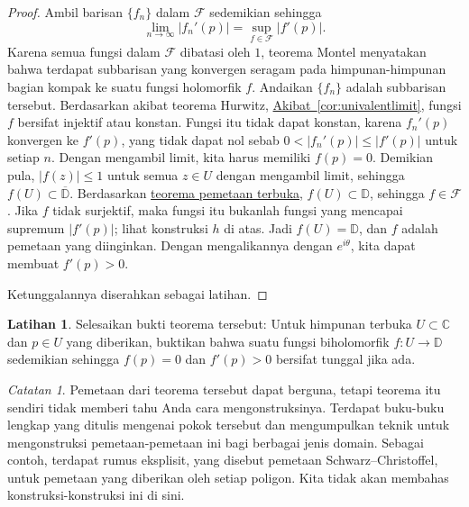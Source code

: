 \documentclass[12pt,openany]{book}
\newcommand{\sabs}[1]{\lvert {#1} \rvert}
\newcommand{\C}{{\mathbb{C}}}
\newcommand{\D}{{\mathbb{D}}}
\newcommand{\sF}{{\mathscr{F}}}
\theoremstyle{plain}
\theoremstyle{remark}
\newtheorem{remark}[thm]{Catatan}
\theoremstyle{definition}
\newenvironment{exbox}{%
    \def\FrameCommand{\vrule width 1pt \relax\hspace{10pt}}%
    \MakeFramed{\advance\hsize-\width\FrameRestore}%
}{%
    \endMakeFramed
}
\theoremstyle{exercise}
\newtheorem{exercise}{Latihan}[section]
\theoremstyle{example}
\newcommand{\corref}[1]{\hyperref[#1]{Akibat~\ref*{#1}}}
\begin{document}
\begin{proof}
Ambil barisan $\{ f_n \}$ dalam
$\sF$ sedemikian sehingga
\begin{equation*}
\lim_{n \to \infty} \sabs{f_n'(p)} = \sup_{f \in \sF} \sabs{f'(p)} .
\end{equation*}
Karena semua fungsi dalam $\sF$ dibatasi oleh $1$,
teorema Montel menyatakan bahwa terdapat subbarisan yang konvergen seragam pada
himpunan-himpunan bagian kompak ke suatu fungsi holomorfik $f$.  Andaikan $\{ f_n \}$ adalah subbarisan tersebut.
Berdasarkan akibat teorema Hurwitz,
\corref{cor:univalentlimit},
fungsi $f$ bersifat injektif atau konstan.  Fungsi itu tidak dapat konstan,
karena $f_n'(p)$ konvergen ke $f'(p)$, yang
tidak dapat nol sebab  
$0 < \sabs{f_n'(p)} \leq \sabs{f'(p)}$ untuk setiap $n$.
Dengan mengambil limit, kita harus memiliki $f(p) = 0$.
Demikian pula,
$\sabs{f(z)} \leq 1$ untuk semua $z \in U$ dengan mengambil limit,
sehingga $f(U) \subset \overline{\D}$.
Berdasarkan \hyperref[thm:OMT]{teorema pemetaan terbuka}, $f(U) \subset \D$, sehingga $f \in
\sF$.  Jika $f$ tidak surjektif, maka fungsi itu bukanlah fungsi yang mencapai
supremum $\sabs{f'(p)}$; lihat konstruksi $h$ di atas.
Jadi $f(U) = \D$, dan $f$ adalah pemetaan yang diinginkan.
Dengan mengalikannya dengan $e^{i\theta}$, kita dapat membuat $f'(p) > 0$.

Ketunggalannya diserahkan sebagai latihan.
\end{proof}

\begin{exbox}
\begin{exercise}
Selesaikan bukti teorema tersebut:
Untuk himpunan terbuka $U \subset \C$ dan $p \in U$ yang diberikan, buktikan
bahwa suatu fungsi biholomorfik 
$f \colon U \to \D$ sedemikian sehingga $f(p) = 0$ dan $f'(p) > 0$ bersifat tunggal jika ada.
\end{exercise}
\end{exbox}

\begin{remark}
Pemetaan dari teorema tersebut dapat berguna, tetapi teorema itu
sendiri tidak memberi tahu Anda cara mengonstruksinya.
Terdapat buku-buku lengkap
yang ditulis mengenai pokok tersebut dan mengumpulkan teknik untuk mengonstruksi
pemetaan-pemetaan ini bagi berbagai jenis domain.
Sebagai contoh, terdapat rumus eksplisit, yang disebut pemetaan
Schwarz--Christoffel, untuk pemetaan yang diberikan oleh setiap poligon.
Kita tidak akan membahas konstruksi-konstruksi ini di sini.
\end{remark}
\end{document}
